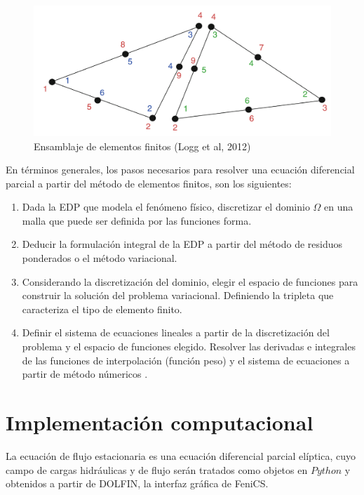 \begin{figure}[ht!]
\centering
\includegraphics[scale=0.55]{Figura_21.png}
\caption{ Ensamblaje de elementos finitos (Logg et al, 2012)}
\label{Figura20:2}
\end{figure}

En términos generales, los pasos necesarios para resolver una ecuación diferencial parcial a partir del método de elementos finitos, son los siguientes:

\begin{enumerate}
\item  Dada la EDP que modela el fenómeno físico, discretizar el dominio $\Omega$ en una malla que puede ser definida por las funciones forma.
\item  Deducir la formulación integral de la EDP a partir del método de residuos ponderados o el método variacional.
\item Considerando la discretización del dominio, elegir el espacio de funciones para construir la solución del problema variacional. Definiendo la tripleta que caracteriza el tipo de elemento finito.
\item Definir el sistema de ecuaciones lineales a partir de la discretización del problema y el espacio de funciones elegido. Resolver las derivadas e integrales de las funciones de interpolación (función peso) y el sistema de ecuaciones a partir de método númericos \cite{Logg2012} \cite{Istok1989} \cite{Whiteley2017}.
\end{enumerate}


\section{Implementación computacional}   

La ecuación de flujo estacionaria es una ecuación diferencial parcial elíptica, cuyo campo de cargas hidráulicas y de flujo serán tratados como objetos en $Python$ y obtenidos a partir de DOLFIN, la interfaz gráfica de FeniCS. 

